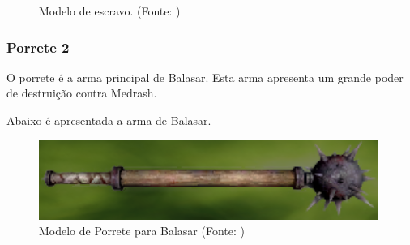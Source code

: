 \begin{itemize}
\begin{figure}[H]
 \caption{Modelo de escravo. (Fonte: \cite{bib:escravo01})}
\label{img:escrava}
\end{figure}
\end{itemize}
\subsubsection{Porrete 2}
O porrete é a arma principal de Balasar. Esta arma apresenta um grande poder de destruição contra Medrash.

Abaixo é apresentada a arma de Balasar.

\begin{figure}[H]
 \centering
 \includegraphics[scale=1]{Imagens/porrete02.png}
 \caption{Modelo de Porrete para Balasar (Fonte: \cite{bib:jogoinfinity})}
\label{img:porrete02}
\end{figure}